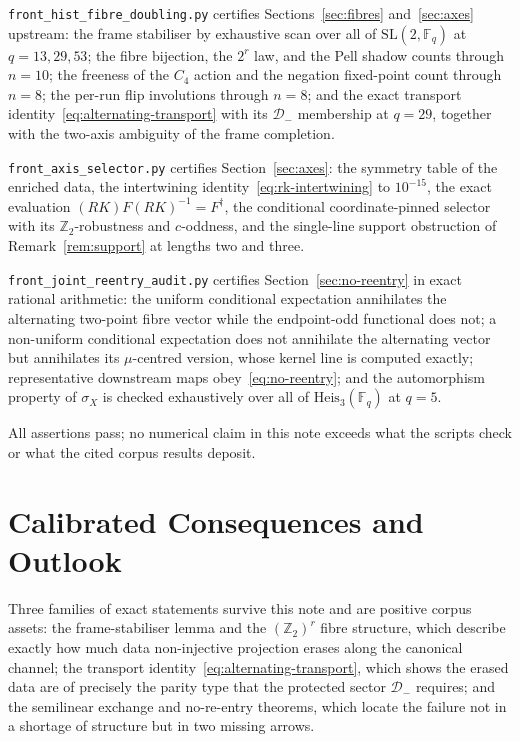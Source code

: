\documentclass[11pt,a4paper]{article}
\theoremstyle{definition}
\theoremstyle{remark}
\newcommand{\Fq}{\mathbb{F}_q}
\newcommand{\G}{\mathrm{SL}(2,\Fq)}
\newcommand{\Heis}{\mathrm{Heis}_3(\Fq)}
\newcommand{\Dminus}{\mathcal{D}_{-}}
\begin{document}
\texttt{front\_hist\_fibre\_doubling.py} certifies Sections~\ref{sec:fibres}
and~\ref{sec:axes} upstream: the frame stabiliser by exhaustive scan over all of $\G$
at $q=13,29,53$; the fibre bijection, the $2^r$ law, and the Pell shadow counts through
$n=10$; the freeness of the $C_4$ action and the negation fixed-point count through
$n=8$; the per-run flip involutions through $n=8$; and the exact transport
identity~\eqref{eq:alternating-transport} with its $\Dminus$ membership at $q=29$,
together with the two-axis ambiguity of the frame completion.

\texttt{front\_axis\_selector.py} certifies Section~\ref{sec:axes}: the symmetry table of
the enriched data, the intertwining identity~\eqref{eq:rk-intertwining} to $10^{-15}$,
the exact evaluation $(RK)F(RK)^{-1}=F^\dagger$, the conditional coordinate-pinned
selector with its $\mathbb{Z}_2$-robustness and $c$-oddness, and the single-line support
obstruction of Remark~\ref{rem:support} at lengths two and three.

\texttt{front\_joint\_reentry\_audit.py} certifies Section~\ref{sec:no-reentry} in exact
rational arithmetic: the uniform conditional expectation annihilates the alternating
two-point fibre vector while the endpoint-odd functional does not; a non-uniform
conditional expectation does not annihilate the alternating vector but annihilates its
$\mu$-centred version, whose kernel line is computed exactly; representative downstream
maps obey~\eqref{eq:no-reentry}; and the automorphism property of $\sigma_X$ is checked
exhaustively over all of $\Heis$ at $q=5$.

All assertions pass; no numerical claim in this note exceeds what the scripts check or
what the cited corpus results deposit.

\section{Calibrated Consequences and Outlook}
\label{sec:outlook}

Three families of exact statements survive this note and are positive corpus assets: the
frame-stabiliser lemma and the $(\mathbb{Z}_2)^r$ fibre structure, which describe exactly
how much data non-injective projection erases along the canonical channel; the transport
identity~\eqref{eq:alternating-transport}, which shows the erased data are of precisely
the parity type that the protected sector $\Dminus$ requires; and the semilinear
exchange and no-re-entry theorems, which locate the failure not in a shortage of
structure but in two missing arrows.
\end{document}
